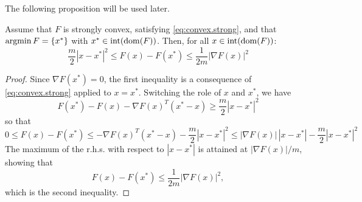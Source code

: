 The following proposition will be used later.
\begin{proposition}
\label{prop:strong.convex}
Assume that $F$ is strongly convex, satisfying \cref{eq:convex.strong}, and that $\operatorname*{argmin} F = \{x^*\}$ with $x^* \in \mathrm{int}(\mathrm{dom}(F))$. Then, for all $x\in \mathrm{int}( \mathrm{dom}(F))$:
\begin{equation}
\label{eq:convex.strong.prop}
\frac m2 |x-x^*|^2 \leq F(x) - F(x^*) \leq \frac1{2m} |\nabla F(x)|^2
\end{equation}
\end{proposition}
\begin{proof}
Since $\nabla F(x^*) = 0$, the first inequality is a consequence of \cref{eq:convex.strong} applied to $x=x^*$. Switching the role of $x$ and $x^*$, we have
\[
F(x^*) - F(x) - \nabla F(x)^T(x^*-x) \geq \frac m2 |x-x^*|^2
\]
so that 
\begin{equation}
0 \leq F(x) - F(x^*) \leq - \nabla F(x)^T(x^*-x) - \frac m2 |x-x^*|^2 \leq |\nabla F(x)| \, |x-x^*| - \frac m2 |x-x^*|^2
\label{eq:convex.strong.prop.1}
\end{equation}
The maximum of the r.h.s. with respect to $|x-x^*|$ is attained at $|\nabla F(x)|/m$, showing that
\[
F(x) - F(x^*) \leq \frac{1}{2m} |\nabla F(x)|^2, 
\]
which is the second inequality.
\end{proof}








%
%
%
%
%
%
%
%


